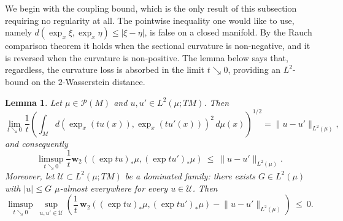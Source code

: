 \documentclass[11pt,reqno]{amsart}
\theoremstyle{plain}
\newtheorem{lem}[thm]{Lemma}
\theoremstyle{definition}
\newcommand{\dw}{\mathbf{w}_2}
\newcommand{\Prob}{\mathcal{P}}
\begin{document}
We begin with the coupling bound, which is the only result of this subsection requiring no regularity at all.
The pointwise inequality one would like to use, namely \( d(\exp_x\xi,\exp_x\eta)\le\lvert\xi-\eta\rvert \), is false on a closed manifold.
By the Rauch comparison theorem \cite[Theorems~1.28 and 1.29]{cheeger_comparison_1975} it holds when the sectional curvature is non-negative, and it is reversed when the curvature is non-positive.
The lemma below says that, regardless, the curvature loss is absorbed in the limit \( t\searrow0 \), providing an \(L^2\)-bound on the \(2\)-Wasserstein distance.
\begin{lem}
\label{lem:exp.upper}
    Let \( \mu\in\Prob(M) \) and \( u,u'\in L^2(\mu;TM) \).  
    Then
    \[
        \lim_{t\searrow0}\frac1t\left(\int_Md\left(\exp_x(tu(x)),\exp_x(tu'(x))\right)^2\,d\mu(x)\right)^{1/2}
        =\lVert u-u'\rVert_{L^2(\mu)},
    \]
    and consequently
    \[
        \limsup_{t\searrow0}\frac{1}{t}\dw\left((\exp tu)_\ast\mu,(\exp tu')_\ast\mu\right) \ \le\ \lVert u-u'\rVert_{L^2(\mu)} .
    \]
    Moreover, let \( \mathcal U\subset L^2(\mu;TM) \) be a dominated family: there exists \( G\in L^2(\mu) \) with \( \lvert u\rvert\le G \) \( \mu \)-almost everywhere for every \( u\in\mathcal U \).
    Then
    \begin{equation}\label{eq:exp.upper.unif}
        \limsup_{t\searrow0}\ \sup_{u,u'\in\mathcal U}\left(\frac1t\,\dw\left((\exp tu)_\ast\mu,(\exp tu')_\ast\mu\right)-\lVert u-u'\rVert_{L^2(\mu)}\right)\ \le\ 0 .
    \end{equation}
\end{lem}
\end{document}
